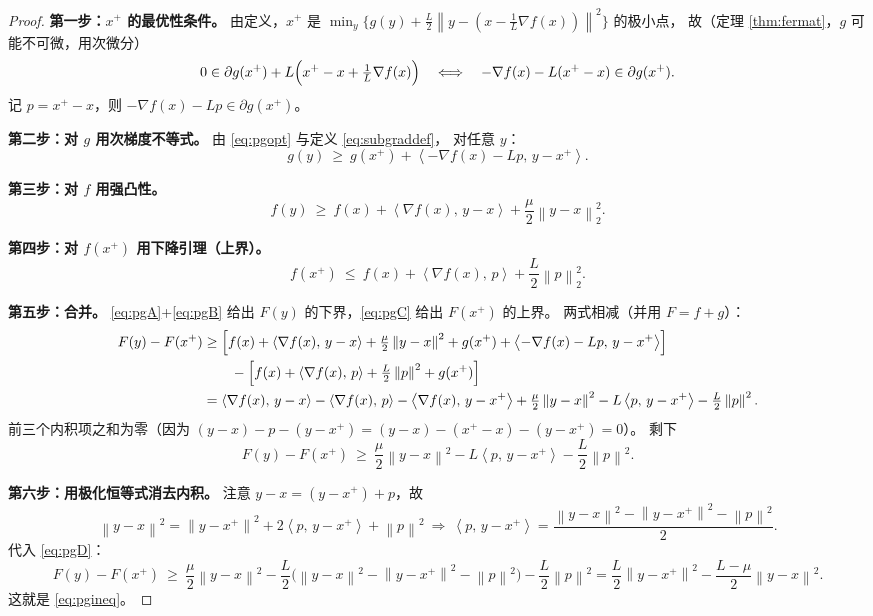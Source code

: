 \documentclass[11pt,a4paper,UTF8]{ctexart}
\theoremstyle{plain}
\theoremstyle{definition}
\theoremstyle{remark}
\newcommand{\norm}[1]{\left\lVert #1 \right\rVert}
\newcommand{\inner}[2]{\left\langle #1,\, #2 \right\rangle}
\begin{document}
\begin{proof}
\textbf{第一步：$x^+$ 的最优性条件。}
由定义，$x^+$ 是 $\min_y\{g(y)+\frac L2\norm{y-(x-\frac1L\nabla f(x))}^2\}$ 的极小点，
故（定理 \ref{thm:fermat}，$g$ 可能不可微，用次微分）
\begin{equation}
0\in\partial g(x^+)+L\Bigl(x^+-x+\tfrac1L\nabla f(x)\Bigr)
\quad\Longleftrightarrow\quad
-\nabla f(x)-L(x^+-x)\in\partial g(x^+).
\label{eq:pgopt}
\end{equation}
记 $p=x^+-x$，则 $-\nabla f(x)-Lp\in\partial g(x^+)$。

\textbf{第二步：对 $g$ 用次梯度不等式。} 由 \eqref{eq:pgopt} 与定义 \eqref{eq:subgraddef}，
对任意 $y$：
\begin{equation}
g(y)\ \ge\ g(x^+)+\inner{-\nabla f(x)-Lp}{y-x^+}.
\label{eq:pgA}
\end{equation}

\textbf{第三步：对 $f$ 用强凸性。}
\begin{equation}
f(y)\ \ge\ f(x)+\inner{\nabla f(x)}{y-x}+\frac\mu2\norm{y-x}_2^2 .
\label{eq:pgB}
\end{equation}

\textbf{第四步：对 $f(x^+)$ 用下降引理（上界）。}
\begin{equation}
f(x^+)\ \le\ f(x)+\inner{\nabla f(x)}{p}+\frac L2\norm p_2^2 .
\label{eq:pgC}
\end{equation}

\textbf{第五步：合并。}
\eqref{eq:pgA}+\eqref{eq:pgB} 给出 $F(y)$ 的下界，\eqref{eq:pgC} 给出 $F(x^+)$ 的上界。
两式相减（并用 $F=f+g$）：
\begin{align*}
F(y)-F(x^+)
&\ge \Bigl[f(x)+\inner{\nabla f(x)}{y-x}+\tfrac\mu2\norm{y-x}^2+g(x^+)+\inner{-\nabla f(x)-Lp}{y-x^+}\Bigr]\\
&\qquad-\Bigl[f(x)+\inner{\nabla f(x)}{p}+\tfrac L2\norm p^2+g(x^+)\Bigr]\\
&=\inner{\nabla f(x)}{y-x}-\inner{\nabla f(x)}{p}-\inner{\nabla f(x)}{y-x^+}
+\tfrac\mu2\norm{y-x}^2-L\inner{p}{y-x^+}-\tfrac L2\norm p^2 .
\end{align*}
前三个内积项之和为零（因为 $(y-x)-p-(y-x^+)=(y-x)-(x^+-x)-(y-x^+)=0$）。
剩下
\begin{equation}
F(y)-F(x^+)\ \ge\ \frac\mu2\norm{y-x}^2-L\inner{p}{y-x^+}-\frac L2\norm p^2 .
\label{eq:pgD}
\end{equation}

\textbf{第六步：用极化恒等式消去内积。}
注意 $y-x=(y-x^+)+p$，故
\[
\norm{y-x}^2=\norm{y-x^+}^2+2\inner{p}{y-x^+}+\norm p^2
\ \Longrightarrow\
\inner{p}{y-x^+}=\frac{\norm{y-x}^2-\norm{y-x^+}^2-\norm p^2}{2}.
\]
代入 \eqref{eq:pgD}：
\[
F(y)-F(x^+)\ \ge\ \frac\mu2\norm{y-x}^2-\frac L2\bigl(\norm{y-x}^2-\norm{y-x^+}^2-\norm p^2\bigr)-\frac L2\norm p^2
=\frac L2\norm{y-x^+}^2-\frac{L-\mu}{2}\norm{y-x}^2 .
\]
这就是 \eqref{eq:pgineq}。
\end{proof}
\end{document}
